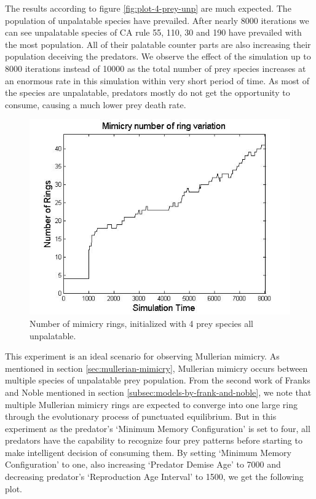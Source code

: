 The results according to figure \ref{fig:plot-4-prey-unp} are much expected. The population of unpalatable species have prevailed. After nearly 8000 iterations we can see unpalatable species of CA rule 55, 110, 30 and 190 have prevailed with the most population. All of their palatable counter parts are also increasing their population deceiving the predators. We observe the effect of the simulation up to 8000 iterations instead of 10000 as the total number of prey species increases at an enormous rate in this simulation within very short period of time. As most of the species are unpalatable, predators mostly do not get the opportunity to consume, causing a much lower prey death rate. 

\begin{figure}[H]
	\centering
	\includegraphics[scale=0.50]{images/ringSize8k-4Prey-unp}
	\caption[Number of mimicry rings (4 prey species all unpalatable)]{Number of mimicry rings, initialized with 4 prey species all unpalatable.}
	\label{fig:ringSize10k-4-Prey-unp}
\end{figure}

This experiment is an ideal scenario for observing Mullerian mimicry. As mentioned in section \ref{sec:mullerian-mimicry}, Mullerian mimicry occurs between multiple species of unpalatable prey population. From the second work of Franks and Noble \cite{franks2003} mentioned in section \ref{subsec:models-by-frank-and-noble}, we note that multiple Mullerian mimicry rings are expected to converge into one large ring through the evolutionary process of punctuated equilibrium. But in this experiment as the predator's `Minimum Memory Configuration' is set to four, all predators have the capability to recognize four prey patterns before starting to make intelligent decision of consuming them. By setting `Minimum Memory Configuration' to one, also increasing `Predator Demise Age' to 7000 and decreasing predator's `Reproduction Age Interval' to 1500, we get the following plot. 

